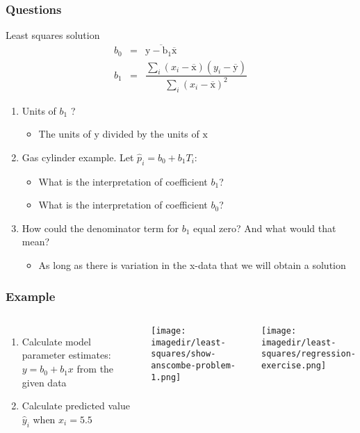 \begin{frame}\frametitle{Questions}
	\begin{block}{Least squares solution} 
			$$ 
			\begin{array}{rcl}
				b_0 &=& \overline{\mathrm{y - b_1\overline{\mathrm{x}}}} \\
				b_1 &=& \dfrac{ \sum_i{\left(x_i - \overline{\mathrm{x}}\right)\left(y_i - \overline{\mathrm{y}}\right) } }{ \sum_i{\left( x_i - \overline{\mathrm{x}}\right)^2} } 
			\end{array}
			$$
	\end{block}
	\begin{enumerate}
		\item	Units of $b_1$ ? 
		\begin{itemize}
			\item	The units of $\mathrm{y}$ divided by the units of $\mathrm{x}$ 
		\end{itemize}
		\item	Gas cylinder example. Let $\hat{p}_i = b_0 + b_1 T_i$: 
		\begin{itemize}
			\item	What is the interpretation of coefficient $b_1$? 
			\item	What is the interpretation of coefficient $b_0$? 
		\end{itemize}
		\item	How could the denominator term for $b_1$ equal zero? And what would that mean? 
		\begin{itemize}
			\item	As long as there is variation in the x-data that we will obtain a solution 
		\end{itemize}
	\end{enumerate}
\end{frame}

\begin{frame}\frametitle{Example}
	\begin{columns}
		\column{5cm} 
			\begin{enumerate}
				\item	Calculate model parameter estimates: $y = b_0 + b_1 x$ from the given data 
				\item	Calculate predicted value $\hat{y}_i$ when $x_i = 5.5$ 
			\end{enumerate}
			\begin{center}
				\texttt{[image: \\imagedir/least-squares/show-anscombe-problem-1.png]} 
			\end{center}
		\column{5cm} 
			\begin{center}
				\texttt{[image: \\imagedir/least-squares/regression-exercise.png]} 
			\end{center}
	\end{columns}
\end{frame}

